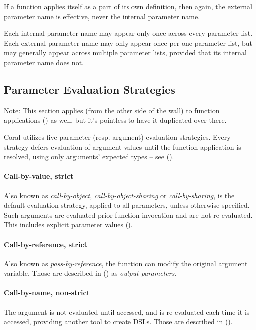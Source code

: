 If a function applies itself as a part of its own definition, then again, the external parameter name is effective, never the internal parameter name. 

Each internal parameter name may appear only once across every parameter list. Each external parameter name may only appear once per one parameter list, but may generally appear across multiple parameter lists, provided that its internal parameter name does not. 





\subsection{Parameter Evaluation Strategies}
\label{sec:param-eval-strategies}

Note: This section applies (from the other side of the wall) to function applications () as well, but it's pointless to have it duplicated over there. 

Coral utilizes five parameter (resp. argument) evaluation strategies. Every strategy defers evaluation of argument values until the function application is resolved, using only arguments' expected types -- see (). 

\paragraph{Call-by-value, strict}
Also known as {\em call-by-object}, {\em call-by-object-sharing} or {\em call-by-sharing}, is the default evaluation strategy, applied to all parameters, unless otherwise specified. Such arguments are evaluated prior function invocation and are not re-evaluated. This includes explicit parameter values ().

\paragraph{Call-by-reference, strict}
Also known as {\em pass-by-reference}, the function can modify the original argument variable. Those are described in () as {\em output parameters}. 

\paragraph{Call-by-name, non-strict}
The argument is not evaluated until accessed, and is re-evaluated each time it is accessed, providing another tool to create DSLs. Those are described in (). 

